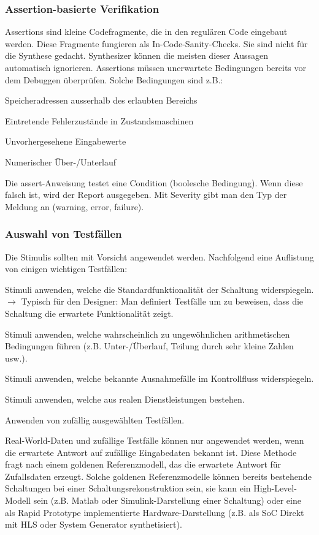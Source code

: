 \subsubsection{Assertion-basierte Verifikation}
Assertions sind kleine Codefragmente, die in den regulären Code eingebaut werden. Diese Fragmente fungieren als In-Code-Sanity-Checks. Sie sind nicht für die Synthese gedacht. Synthesizer können die meisten dieser Aussagen automatisch ignorieren.
Assertions müssen unerwartete Bedingungen bereits vor dem Debuggen überprüfen. Solche Bedingungen sind z.B.:
\begin{compactitem}
    \item Speicheradressen ausserhalb des erlaubten Bereichs
    \item Eintretende Fehlerzustände in Zustandsmaschinen
    \item Unvorhergesehene Eingabewerte
    \item Numerischer Über-/Unterlauf
\end{compactitem}

Die assert-Anweisung testet eine Condition (boolesche Bedingung). Wenn diese falsch ist, wird der Report ausgegeben. Mit Severity gibt man den Typ der Meldung an (warning, error, failure).
\subsubsection{Auswahl von Testfällen}
Die Stimulis sollten mit Vorsicht angewendet werden. Nachfolgend eine Auflistung von einigen wichtigen Testfällen:
\begin{compactitem}
    \item Stimuli anwenden, welche die Standardfunktionalität der Schaltung widerspiegeln. $\rightarrow$ Typisch für den Designer: Man definiert Testfälle um zu beweisen, dass die Schaltung die erwartete Funktionalität zeigt.
    \item Stimuli anwenden, welche wahrscheinlich zu ungewöhnlichen arithmetischen Bedingungen führen (z.B. Unter-/Überlauf, Teilung durch sehr kleine Zahlen usw.).
    \item Stimuli anwenden, welche bekannte Ausnahmefälle im Kontrollfluss widerspiegeln.
    \item Stimuli anwenden, welche aus realen Dienstleistungen bestehen.
    \item Anwenden von zufällig ausgewählten Testfällen.
\end{compactitem}
Real-World-Daten und zufällige Testfälle können nur angewendet werden, wenn die erwartete Antwort auf zufällige Eingabedaten bekannt ist. Diese Methode fragt nach einem goldenen Referenzmodell, das die erwartete Antwort für Zufallsdaten erzeugt. Solche goldenen Referenzmodelle können bereits bestehende Schaltungen bei einer Schaltungsrekonstruktion sein, sie kann ein High-Level-Modell sein (z.B. Matlab oder Simulink-Darstellung einer Schaltung) oder eine als Rapid Prototype implementierte Hardware-Darstellung (z.B. als SoC Direkt mit HLS oder System Generator synthetisiert).
